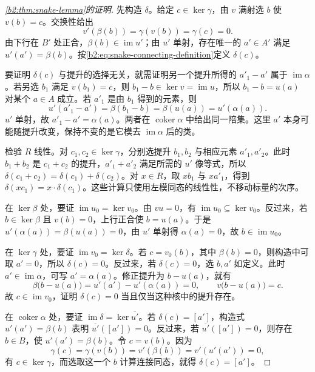 \begin{proof}[\cref{b2:thm:snake-lemma}的证明]
	先构造 \(\delta\)。给定 \(c\in\ker\gamma\)，由 \(v\) 满射选 \(b\) 使 \(v(b)=c\)。交换性给出
	\[
		v'(\beta(b))=\gamma(v(b))=\gamma(c)=0.
	\]
	由下行在 \(B'\) 处正合，\(\beta(b)\in\operatorname{im}u'\)；由 \(u'\) 单射，存在唯一的 \(a'\in A'\) 满足 \(u'(a')=\beta(b)\)。按\eqref{b2:eq:snake-connecting-definition}定义 \(\delta(c)\)。

	要证明 \(\delta(c)\) 与提升的选择无关，就需证明另一个提升所得的 \(a'_1-a'\) 属于 \(\operatorname{im}\alpha\)。若另选 \(b_1\) 满足 \(v(b_1)=c\)，则 \(b_1-b\in\ker v=\operatorname{im}u\)，所以 \(b_1-b=u(a)\) 对某个 \(a\in A\) 成立。若 \(a'_1\) 是由 \(b_1\) 得到的元素，则
	\[
		u'(a'_1-a')=\beta(b_1-b)=\beta(u(a))=u'(\alpha(a)).
	\]
	\(u'\) 单射，故 \(a'_1-a'=\alpha(a)\)。两者在 \(\operatorname{coker}\alpha\) 中给出同一陪集。这里 \(a'\) 本身可能随提升改变，保持不变的是它模去 \(\operatorname{im}\alpha\) 后的类。

	检验 \(R\) 线性。对 \(c_1,c_2\in\ker\gamma\)，分别选提升 \(b_1,b_2\) 与相应元素 \(a'_1,a'_2\)。此时 \(b_1+b_2\) 是 \(c_1+c_2\) 的提升，\(a'_1+a'_2\) 满足所需的 \(u'\) 像等式，所以 \(\delta(c_1+c_2)=\delta(c_1)+\delta(c_2)\)。对 \(x\in R\)，取 \(xb_1\) 与 \(xa'_1\)，得到 \(\delta(xc_1)=x\cdot\delta(c_1)\)。这些计算只使用左模同态的线性性，不移动标量的次序。

	在 \(\ker\beta\) 处，要证 \(\operatorname{im}u_0=\ker v_0\)。由 \(vu=0\)，有 \(\operatorname{im}u_0\subseteq\ker v_0\)。反过来，若 \(b\in\ker\beta\) 且 \(v(b)=0\)，上行正合使 \(b=u(a)\)。于是 \(u'(\alpha(a))=\beta(u(a))=0\)，由 \(u'\) 单射得 \(\alpha(a)=0\)，故 \(b\in\operatorname{im}u_0\)。

	在 \(\ker\gamma\) 处，要证 \(\operatorname{im}v_0=\ker\delta\)。若 \(c=v_0(b)\)，其中 \(\beta(b)=0\)，则构造中可取 \(a'=0\)，所以 \(\delta(c)=0\)。反过来，若 \(\delta(c)=0\)，选 \(b,a'\) 如定义。此时 \(a'\in\operatorname{im}\alpha\)，可写 \(a'=\alpha(a)\)。修正提升为 \(b-u(a)\)，就有
	\[
		\beta\bigl(b-u(a)\bigr)=u'(a')-u'(\alpha(a))=0, \qquad v\bigl(b-u(a)\bigr)=c.
	\]
	故 \(c\in\operatorname{im}v_0\)，证明 \(\delta(c)=0\) 当且仅当这种核中的提升存在。

	在 \(\operatorname{coker}\alpha\) 处，要证 \(\operatorname{im}\delta=\ker\overline{u'}\)。若 \(\delta(c)=[a']\)，构造式 \(u'(a')=\beta(b)\) 表明 \(\overline{u'}([a'])=0\)。反过来，若 \(\overline{u'}([a'])=0\)，则存在 \(b\in B\)，使 \(u'(a')=\beta(b)\)。令 \(c=v(b)\)。因为
	\[
		\gamma(c)=\gamma(v(b))=v'(\beta(b))=v'(u'(a'))=0,
	\]
	有 \(c\in\ker\gamma\)，而选取这一个 \(b\) 计算连接同态，就得 \(\delta(c)=[a']\)。


\end{proof}
